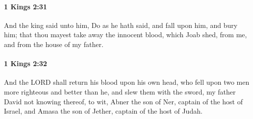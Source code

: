 		\paragraph{1 Kings 2:31} %
			\label{1KINGS-2-31}

			And the king said unto him, Do as he hath said, and fall upon him, and bury him; that thou mayest take away the innocent blood, which Joab shed, from me, and from the house of my father.


		\paragraph{1 Kings 2:32} %
			\label{1KINGS-2-32}

			And the LORD shall return his blood upon his own head, who fell upon two men more righteous and better than he, and slew them with the sword, my father David not knowing thereof, to wit, Abner the son of Ner, captain of the host of Israel, and Amasa the son of Jether, captain of the host of Judah.

